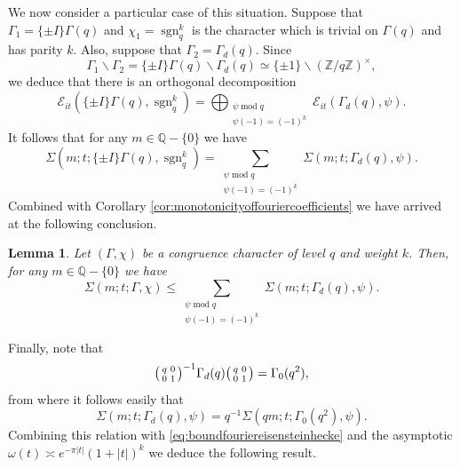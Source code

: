 \documentclass{article}
\newtheorem{lem}[thm]{Lemma}
\theoremstyle{named}
\newcommand{\E}{\mathcal{E}}
\newcommand{\Z}{\mathbb{Z}}
\newcommand{\Q}{\mathbb{Q}}
\DeclareMathOperator{\sgn}{sgn}
\DeclareMathOperator{\modulo}{mod}
\begin{document}
We now consider a particular case of this situation. Suppose that $\Gamma_1 = \{\pm I\}\Gamma(q)$ and $\chi_1 = \sgn_q^k$ is the character which is trivial on $\Gamma(q)$ and has parity $k$. Also, suppose that $\Gamma_2 = \Gamma_d(q)$. Since 
\begin{equation*}
    \Gamma_1 \backslash \Gamma_2 = \{\pm I\}\Gamma(q) \backslash \Gamma_d(q) \simeq \{\pm 1\} \backslash (\Z/q\Z)^\times,
\end{equation*}
we deduce that there is an orthogonal decomposition
\begin{equation*}
    \E_{it}(\{\pm I\}\Gamma(q), \sgn_q^k) = \bigoplus_{\substack{\psi \modulo q\\
    \psi(-1) = (-1)^k}}\E_{it}(\Gamma_d(q), \psi).
\end{equation*}
It follows that for any $m \in \Q - \{0\}$ we have
\begin{equation*}
    \Sigma(m; t; \{\pm I\}\Gamma(q), \sgn_q^k) = \sum_{\substack{\psi \modulo q\\
    \psi(-1) = (-1)^k}} \Sigma(m; t; \Gamma_d(q), \psi).
\end{equation*} 
Combined with Corollary \ref{cor:monotonicityoffouriercoefficients} we have arrived at the following conclusion.
\begin{lem}\label{lem:controlfouriercoefficients}
Let $(\Gamma, \chi)$ be a congruence character of level $q$ and weight $k$. Then, for any $m \in \Q - \{0\}$ we have
\begin{equation*}
    \Sigma(m; t; \Gamma, \chi) \leq \sum_{\substack{\psi \modulo q\\
    \psi(-1) = (-1)^k}} \Sigma(m; t; \Gamma_d(q), \psi).
\end{equation*}
\end{lem}
Finally, note that
\begin{equation*}
    \begin{psmallmatrix}
        q & 0\\
        0 & 1
    \end{psmallmatrix}^{-1}\Gamma_d(q)\begin{psmallmatrix}
        q & 0\\
        0 & 1
    \end{psmallmatrix} = \Gamma_0(q^2),
\end{equation*}
from where it follows easily that 
\begin{equation}\label{eq:comparisonfourierGammadandGamma0}
    \Sigma(m; t; \Gamma_d(q), \psi) = q^{-1}\Sigma(qm; t; \Gamma_0(q^2), \psi).
\end{equation}
Combining this relation with \eqref{eq:boundfouriereisensteinhecke} and the asymptotic $\omega(t) \asymp e^{-\pi|t|}(1 + |t|)^k$ we deduce the following result.
\end{document}

